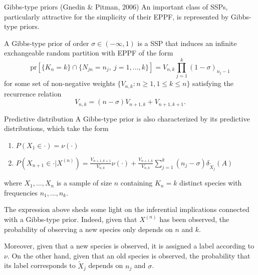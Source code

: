 \documentclass[11pt, handout]{beamer}
\begin{document}
\begin{frame}{Gibbs-type priors (Gnedin \& Pitman, 2006)}
    An important class of SSPs, particularly attractive for the simplicity of their EPPF, is represented by Gibbs-type priors.
    \begin{definition}
        A Gibbs-type prior of order \(\sigma \in (-\infty, 1)\) is a SSP that induces an infinite exchangeable random partition with EPPF of the form
        \begin{equation*}
            \text{pr}[\{K_n = k\} \cap \{N_{jn} = n_j,\ j = 1,...,k\}] = V_{n,k} \prod_{j=1}^k (1 - \sigma)_{n_j - 1}
        \end{equation*}
        for some set of non-negative weights \(\{V_{n, k} \colon n \geq 1, 1 \leq k \leq n\}\) satisfying the recurrence relation
        \begin{equation}
            \label{eq:recurrence}
            V_{n, k} = (n - \sigma) V_{n +1, k} + V_{n + 1, k + 1}.
        \end{equation}
    \end{definition}
\end{frame}

\begin{frame}{Predictive distribution}
    A Gibbs-type prior is also characterized by its predictive distributions, which take the form
    \begin{enumerate}
        \item \(P(X_1 \in \cdot) = \nu(\cdot)\)
        \item \(P(X_{n + 1} \in \cdot | X^{(n)}) = \frac{V_{n+1,k+1}}{V_{n,k}} \nu(\cdot) + \frac{V_{n+1,k}}{V_{n, k}} \sum_{j = 1}^k (n_j - \sigma) \delta_{\tilde{X}_j}(A)\)
    \end{enumerate}
    where \(X_1,...,X_n\) is a sample of size \(n\) containing \(K_n = k\) distinct species with frequencies \(n_1,...,n_k\).
    \medskip

    The expression above sheds some light on the inferential implications connected with a Gibbs-type prior. Indeed, given that \(X^{(n)}\) has been observed, the probability of observing a new species only depends on \(n\) and \(k\). 
    \medskip
    
    Moreover, given that a new species is observed, it is assigned a label according to \(\nu\). On the other hand, given that an old species is observed, the probability that its label corresponds to \(\tilde{X}_j\) depends on \(n_j\) and \(\sigma\).
\end{frame}
\end{document}
